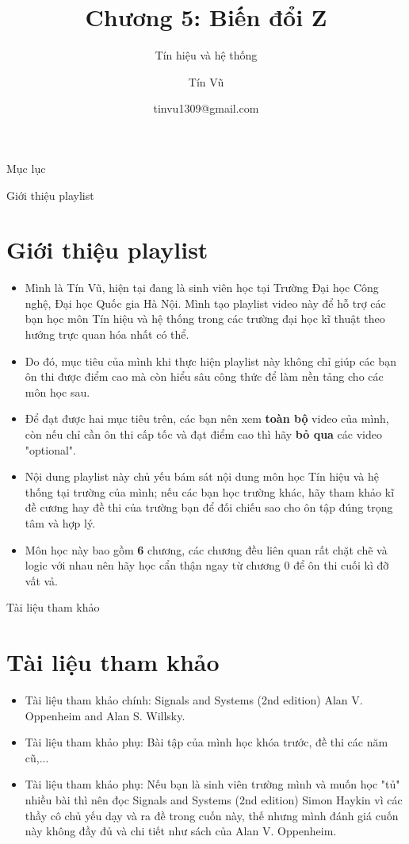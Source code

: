 \documentclass[8pt]{beamer}
\title[Chương 5: Biến đổi Z] %
{Chương 5: Biến đổi Z}
\subtitle{Tín hiệu và hệ thống}
\author[Tín hiệu và hệ thống] %
{Tín Vũ}
\date[VLC 2021] %
{tinvu1309@gmail.com}
\begin{document}
\frame{\titlepage}
\begin{frame}{Mục lục}
\tableofcontents
\end{frame}
\begin{frame}{Giới thiệu playlist}
\section{Giới thiệu playlist}
	\begin{itemize}
		\item Mình là Tín Vũ, hiện tại đang là sinh viên học tại Trường Đại học Công nghệ, Đại học Quốc gia Hà Nội. Mình tạo playlist video này để hỗ trợ các bạn học môn Tín hiệu và hệ thống trong các trường đại học kĩ thuật theo hướng \alert{trực quan hóa} nhất có thể.
		\item Do đó, mục tiêu của mình khi thực hiện playlist này không chỉ giúp các bạn ôn thi được điểm cao mà còn \alert{hiểu sâu công thức để làm nền tảng cho các môn học sau}.
		\item Để đạt được hai mục tiêu trên, các bạn nên xem \textbf{toàn bộ} video của mình, còn nếu chỉ cần ôn thi cấp tốc và đạt điểm cao thì hãy \textbf{bỏ qua} các video "optional".
		\item Nội dung playlist này chủ yếu bám sát nội dung môn học Tín hiệu và hệ thống tại trường của mình; nếu các bạn học trường khác, hãy tham khảo kĩ đề cương hay đề thi của trường bạn để đối chiếu sao cho ôn tập đúng trọng tâm và hợp lý. 
		\item Môn học này bao gồm \textbf{6} chương, các chương đều liên quan rất chặt chẽ và logic với nhau nên hãy học cẩn thận ngay từ \alert{chương 0} để ôn thi cuối kì đỡ vất vả.
	\end{itemize}
\end{frame}
\begin{frame}{Tài liệu tham khảo}
\section{Tài liệu tham khảo}
\begin{itemize}
		\item Tài liệu tham khảo chính: Signals and Systems (2nd edition) Alan V. Oppenheim and Alan S. Willsky.
		\item Tài liệu tham khảo phụ: Bài tập của mình học khóa trước, đề thi các năm cũ,...
		\item Tài liệu tham khảo phụ: Nếu bạn là sinh viên trường mình và muốn học "tủ" nhiều bài thì nên đọc Signals and Systems (2nd edition) Simon Haykin vì các thầy cô chủ yếu dạy và ra đề trong cuốn này, thế nhưng mình đánh giá cuốn này không đầy đủ và chi tiết như sách của Alan V. Oppenheim. 
	\end{itemize}
\end{frame}
\end{document}
